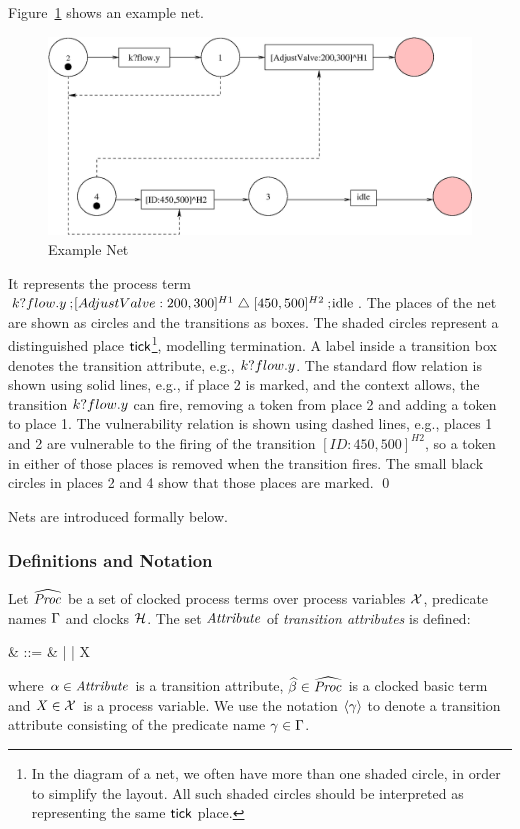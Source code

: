 \begin{exampleb}
Figure~\ref{fig:examplenet} shows an example net. 
\begin{figure}[h]
\begin{center}
\includegraphics[width=.8\linewidth]{TGGEN/interrupt.eps}
\end{center}
\caption{Example Net\label{fig:examplenet}}
\end{figure}
It represents the process term ${k}?flow.y \mathbin{\mathrm{;}\!}
[AdjustValve:200,300]^{H1} \mathrel{\mathord{\triangle}} [450,500]^{H2} \mathbin{\mathrm{;}\!} \mathrm{idle}$. The
places of the net are shown as circles and the transitions as
boxes. The shaded circles represent a distinguished place
${\sf tick}$\footnote{In the diagram of a net, we often have more than
one shaded circle, in order to simplify the layout. All such shaded
circles should be interpreted as representing the same ${\sf tick}$
place.}, modelling termination. A label inside a transition box
denotes the transition attribute, e.g., ${k}?flow.y$.  The standard
flow relation is shown using solid lines, e.g., if place 2 is marked,
and the context allows, the transition ${k}?flow.y$ can fire, removing
a token from place 2 and adding a token to place 1.  The vulnerability
relation is shown using dashed lines, e.g., places 1 and 2 are
vulnerable to the firing of the transition $[ID:450,500]^{H2}$, so a
token in either of those places is removed when the transition fires.
The small black circles in places 2 and 4 show that those places are
marked.
\qed
\end{exampleb}
Nets are introduced formally below.

\subsubsection{Definitions and Notation}
Let $\widehat{\text{\it Proc\/}_{}}$ be a set of clocked process terms over process variables
$\XX$, predicate names $\Gamma$ and clocks $\clocks$. The set ${\text{\it Attribute\/}}$
of \emph{transition attributes} is defined:
\begin{syntax}
\tattrib & ::= & \cbasic | \gu{\g} | X
\end{syntax}
where $\alpha \in {\text{\it Attribute\/}}$ is a transition attribute, ${\widehat{\beta}} \in
\widehat{\text{\it Proc\/}_{}}$ is a clocked basic term and $X \in \XX$ is a process
variable. We use the notation ${\langle \gamma\rangle}$ to denote a transition
attribute consisting of the predicate name $\gamma \in \Gamma$.

